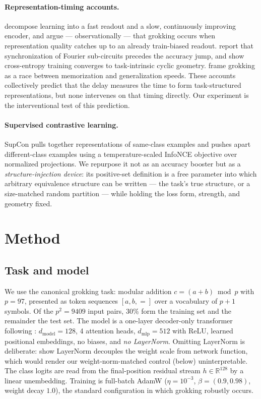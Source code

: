\documentclass[11pt]{article}
\begin{document}
\paragraph{Representation-timing accounts.}
\citet{twospeeds2026} decompose learning into a fast readout and a slow, continuously improving
encoder, and argue --- observationally --- that grokking occurs when representation quality
catches up to an already train-biased readout. \citet{circuitsync2026} report that synchronization
of Fourier sub-circuits precedes the accuracy jump, and \citet{taskintrinsic2026} show cross-entropy
training converges to task-intrinsic cyclic geometry. \citet{capacity2026} frame grokking as a race
between memorization and generalization speeds. These accounts collectively predict that the delay
measures the time to form task-structured representations, but none intervenes on that timing
directly. Our experiment is the interventional test of this prediction.

\paragraph{Supervised contrastive learning.}
SupCon \citep{khosla2020supervised} pulls together representations of same-class examples and
pushes apart different-class examples using a temperature-scaled InfoNCE objective over normalized
projections. We repurpose it not as an accuracy booster but as a \emph{structure-injection device}:
its positive-set definition is a free parameter into which arbitrary equivalence structure can be
written --- the task's true structure, or a size-matched random partition --- while holding the
loss form, strength, and geometry fixed.

\section{Method}

\subsection{Task and model}
We use the canonical grokking task: modular addition $c=(a+b)\bmod p$ with $p=97$, presented as
token sequences $[a, b, =]$ over a vocabulary of $p{+}1$ symbols. Of the $p^2=9409$ input pairs,
30\% form the training set and the remainder the test set. The model is a one-layer decoder-only
transformer following \citet{nanda2023progress}: $d_{\text{model}}{=}128$, 4 attention heads,
$d_{\text{mlp}}{=}512$ with ReLU, learned positional embeddings, no biases, and \emph{no LayerNorm}.
Omitting LayerNorm is deliberate: \citet{weightnormdelay2026} show LayerNorm decouples the weight
scale from network function, which would render our weight-norm-matched control (below)
uninterpretable. The class logits are read from the final-position residual stream
$h\in\mathbb{R}^{128}$ by a linear unembedding. Training is full-batch AdamW
($\eta=10^{-3}$, $\beta=(0.9, 0.98)$, weight decay $1.0$), the standard configuration in which
grokking robustly occurs.
\end{document}
